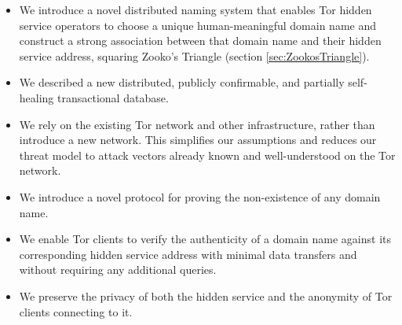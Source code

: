 \begin{itemize}
	\item We introduce a novel distributed naming system that enables Tor hidden service operators to choose a unique human-meaningful domain name and construct a strong association between that domain name and their hidden service address, squaring Zooko's Triangle (section \ref{sec:ZookosTriangle}).
	\item We described a new distributed, publicly confirmable, and partially self-healing transactional database.
	\item We rely on the existing Tor network and other infrastructure, rather than introduce a new network. This simplifies our assumptions and reduces our threat model to attack vectors already known and well-understood on the Tor network.
	\item We introduce a novel protocol for proving the non-existence of any domain name.
	\item We enable Tor clients to verify the authenticity of a domain name against its corresponding hidden service address with minimal data transfers and without requiring any additional queries.
	\item We preserve the privacy of both the hidden service and the anonymity of Tor clients connecting to it.
\end{itemize}
